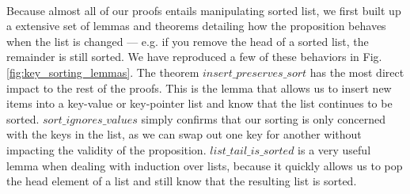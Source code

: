 \paragraph{}
Because almost all of our proofs entails manipulating sorted list, we first built up a extensive set of lemmas and theorems detailing how the proposition behaves when the list is changed --- e.g. if you remove the head of a sorted list, the remainder is still sorted. We have reproduced a few of these behaviors in Fig. \ref{fig:key_sorting_lemmas}. The theorem $insert\_preserves\_sort$ has the most direct impact to the rest of the proofs. This is the lemma that allows us to insert new items into a key-value or key-pointer list and know that the list continues to be sorted. $sort\_ignores\_values$ simply confirms that our sorting is only concerned with the keys in the list, as we can swap out one key for another without impacting the validity of the proposition. $list\_tail\_is\_sorted$ is a very useful lemma when dealing with induction over lists, because it quickly allows us to pop the head element of a list and still know that the resulting list is sorted.

